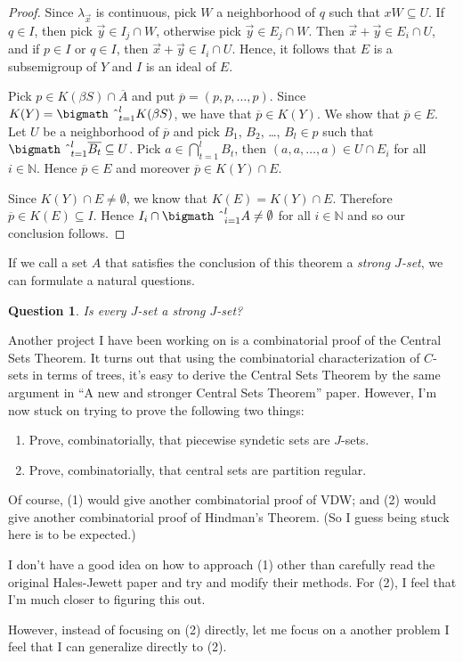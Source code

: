 \documentclass[12pt]{letter}
\theoremstyle{plain}
\newtheorem*{ques}{Question}
\theoremstyle{definition}
\newcommand{\bbN}{\mathbb{N}}
\newcommand{\bigtimes}{\hbox{\bigmath \char'2}}
\begin{document}
\begin{letter}{}
\begin{proof}
  Since $\lambda_{\vec{x}}$ is continuous, pick $W$ a neighborhood of
  $q$ such that $xW \subseteq U$. 
  If $q \in I$, then pick $\vec{y} \in I_j \cap W$, otherwise pick
  $\vec{y} \in E_j \cap W$.
  Then $\vec{x}+\vec{y} \in E_i \cap U$, and if $p \in I$ or $q \in
  I$, then $\vec{x} + \vec{y} \in I_i \cap U$. 
  Hence, it follows that $E$ is a subsemigroup of $Y$ and $I$ is an
  ideal of $E$.

  Pick $p \in K(\beta S) \cap \overline{A}$ and put $\overline{p} =
  (p, p, \ldots, p)$. 
  Since $K(Y) = \bigtimes_{t=1}^l K(\beta S)$, we have that
  $\overline{p} \in K(Y)$. 
  We show that $\overline{p} \in E$.
  Let $U$ be a neighborhood of $\overline{p}$ and pick $B_1$, $B_2$,
  \dots, $B_l \in p$ such that $\bigtimes_{t=1}^l \overline{B_t}
  \subseteq U$. 
  Pick $a \in \bigcap_{t=1}^l B_t$, then $(a, a, \ldots, a) \in U \cap
  E_i$ for all $i \in \bbN$. 
  Hence $\overline{p} \in E$ and moreover $\overline{p} \in K(Y) \cap
  E$.

  Since $K(Y) \cap E \ne \emptyset$, we know that $K(E) = K(Y) \cap
  E$.
  Therefore $\overline{p} \in K(E) \subseteq I$.
  Hence $I_i \cap \bigtimes_{i=1}^l A \ne \emptyset$ for all $i \in
  \bbN$ and so our conclusion follows.
\end{proof}

If we call a set $A$ that satisfies the conclusion of this theorem a
\textsl{strong $J$-set}, we can formulate a natural questions. 

\begin{ques}
  Is every $J$-set a strong $J$-set?
\end{ques}

Another project I have been working on is a combinatorial proof of the
Central Sets Theorem.
It turns out that using the combinatorial characterization of $C$-sets
in terms of trees, it's easy to derive the Central Sets Theorem by the
same argument in ``A new and stronger Central Sets Theorem'' paper.
However, I'm now stuck on trying to prove the following two things:
\begin{enumerate}
  \item Prove, combinatorially, that piecewise syndetic sets are
    $J$-sets.
  
  \item Prove, combinatorially, that central sets are partition
    regular. 
\end{enumerate}
Of course, (1) would give another combinatorial proof of VDW; and (2)
would give another combinatorial proof of Hindman's Theorem. 
(So I guess being stuck here is to be expected.)


I don't have a good idea on how to approach (1) other than carefully
read the original Hales-Jewett paper and try and modify their methods.
For (2), I feel that I'm much closer to figuring this out.

However, instead of focusing on (2) directly, let me focus on a
another problem I feel that I can generalize directly to
(2). 

\end{letter}
\end{document}
